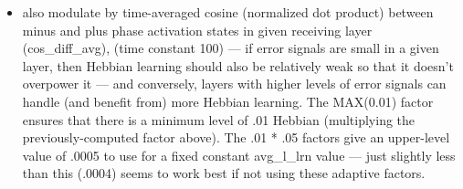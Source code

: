 \begin{itemize}
\begin{itemize}
      \begin{itemize}
      \tightlist
      \item
        also modulate by time-averaged cosine (normalized dot product)
        between minus and plus phase activation states in given
        receiving layer (cos\_diff\_avg), (time constant 100) --- if
        error signals are small in a given layer, then Hebbian learning
        should also be relatively weak so that it doesn't overpower it
        --- and conversely, layers with higher levels of error signals
        can handle (and benefit from) more Hebbian learning. The
        MAX(0.01) factor ensures that there is a minimum level of .01
        Hebbian (multiplying the previously-computed factor above). The
        .01 * .05 factors give an upper-level value of .0005 to use for
        a fixed constant avg\_l\_lrn value --- just slightly less than
        this (.0004) seems to work best if not using these adaptive
        factors.
      \end{itemize}
    \end{itemize}
\end{itemize}

